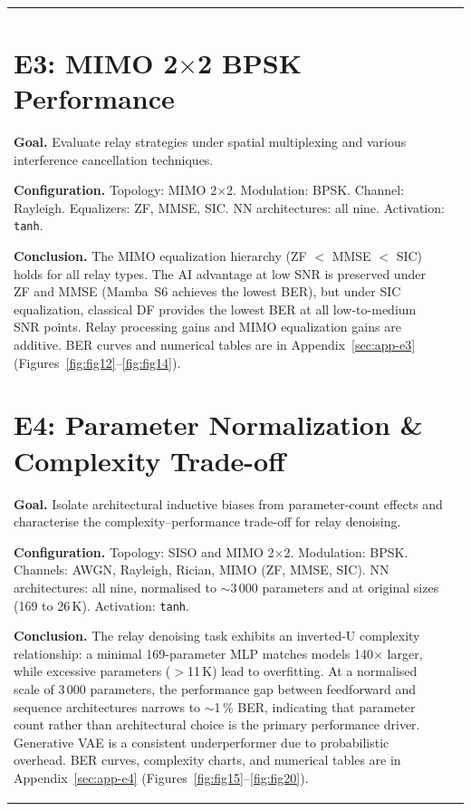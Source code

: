 {\begin{longtable}[]{@{}ll@{}}
\section{E3: MIMO 2$\times$2 BPSK Performance}\label{sec:mimo-2x2-bpsk-performance}

\textbf{Goal.}
Evaluate relay strategies under spatial multiplexing and various interference
cancellation techniques.

\textbf{Configuration.}
Topology: MIMO 2$\times$2.
Modulation: BPSK.
Channel: Rayleigh.
Equalizers: ZF, MMSE, SIC.
NN architectures: all nine.
Activation: \texttt{tanh}.

\textbf{Conclusion.}
The MIMO equalization hierarchy (ZF $<$ MMSE $<$ SIC) holds for all relay types.
The AI advantage at low SNR is preserved under ZF and MMSE (Mamba~S6 achieves the
lowest BER), but under SIC equalization, classical DF provides the lowest BER at all
low-to-medium SNR points.
Relay processing gains and MIMO equalization gains are additive.
BER curves and numerical tables are in Appendix~\ref{sec:app-e3}
(Figures~\ref{fig:fig12}--\ref{fig:fig14}).

\section{E4: Parameter Normalization \& Complexity Trade-off}\label{sec:parameter-normalization-complexity-trade-off}

\textbf{Goal.}
Isolate architectural inductive biases from parameter-count effects and characterise
the complexity--performance trade-off for relay denoising.

\textbf{Configuration.}
Topology: SISO and MIMO 2$\times$2.
Modulation: BPSK.
Channels: AWGN, Rayleigh, Rician, MIMO (ZF, MMSE, SIC).
NN architectures: all nine, normalised to $\sim$3\,000 parameters and at original
sizes (169 to 26\,K).
Activation: \texttt{tanh}.

\textbf{Conclusion.}
The relay denoising task exhibits an inverted-U complexity relationship: a minimal
169-parameter MLP matches models 140$\times$ larger, while excessive parameters
($>$11\,K) lead to overfitting.
At a normalised scale of 3\,000 parameters, the performance gap between feedforward
and sequence architectures narrows to $\sim$1\,\% BER, indicating that parameter
count rather than architectural choice is the primary performance driver.
Generative VAE is a consistent underperformer due to probabilistic overhead.
BER curves, complexity charts, and numerical tables are in Appendix~\ref{sec:app-e4}
(Figures~\ref{fig:fig15}--\ref{fig:fig20}).


\end{longtable}}
